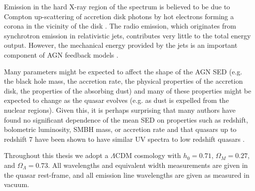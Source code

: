 Emission in the hard X-ray region of the spectrum is believed to be due to Compton up-scattering of accretion disk photons by hot electrons forming a corona in the vicinity of the disk \citep[e.g.][]{sunyaev80}. 
The radio emission, which originates from synchrotron emission in relativistic jets, contributes very little to the total energy output.
However, the mechanical energy provided by the jets is an important component of AGN feedback models \citep[e.g.][]{fabian12}. 

Many parameters might be expected to affect the shape of the AGN SED (e.g. the black hole mass, the accretion rate, the physical properties of the accretion disk, the properties of the absorbing dust) and many of these properties might be expected to change as the quasar evolves (e.g. as dust is expelled from the nuclear regions). Given this, it is perhaps surprising that many authors have found no significant dependence of the mean SED on properties such as redshift, bolometric luminosity, SMBH mass, or accretion rate \citep[e.g.][]{elvis12,hao13} and that quasars up to redshift 7 have been shown to have similar UV spectra to low redshift quasars \citep[e.g.][]{mortlock11}.

Throughout this thesis we adopt a $\Lambda$CDM cosmology with $h_0=0.71$, $\Omega_M=0.27$, and $\Omega_\Lambda=0.73$. 
All wavelengths and equivalent width measurements are given in the quasar rest-frame, and all emission line wavelengths are given as measured in vacuum.

